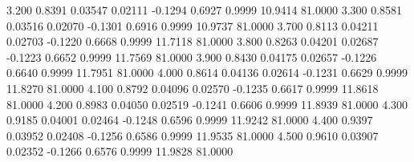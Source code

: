    3.200   0.8391   0.03547   0.02111  -0.1294   0.6927   0.9999  10.9414  81.0000
   3.300   0.8581   0.03516   0.02070  -0.1301   0.6916   0.9999  10.9737  81.0000
   3.700   0.8113   0.04211   0.02703  -0.1220   0.6668   0.9999  11.7118  81.0000
   3.800   0.8263   0.04201   0.02687  -0.1223   0.6652   0.9999  11.7569  81.0000
   3.900   0.8430   0.04175   0.02657  -0.1226   0.6640   0.9999  11.7951  81.0000
   4.000   0.8614   0.04136   0.02614  -0.1231   0.6629   0.9999  11.8270  81.0000
   4.100   0.8792   0.04096   0.02570  -0.1235   0.6617   0.9999  11.8618  81.0000
   4.200   0.8983   0.04050   0.02519  -0.1241   0.6606   0.9999  11.8939  81.0000
   4.300   0.9185   0.04001   0.02464  -0.1248   0.6596   0.9999  11.9242  81.0000
   4.400   0.9397   0.03952   0.02408  -0.1256   0.6586   0.9999  11.9535  81.0000
   4.500   0.9610   0.03907   0.02352  -0.1266   0.6576   0.9999  11.9828  81.0000
